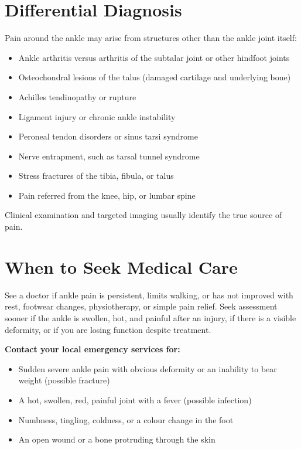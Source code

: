 \section*{Differential Diagnosis}
Pain around the ankle may arise from structures other than the ankle joint itself:

\begin{itemize}
    \item Ankle arthritis versus arthritis of the subtalar joint or other hindfoot joints
    \item Osteochondral lesions of the talus (damaged cartilage and underlying bone)
    \item Achilles tendinopathy or rupture
    \item Ligament injury or chronic ankle instability
    \item Peroneal tendon disorders or sinus tarsi syndrome
    \item Nerve entrapment, such as tarsal tunnel syndrome
    \item Stress fractures of the tibia, fibula, or talus
    \item Pain referred from the knee, hip, or lumbar spine
\end{itemize}

Clinical examination and targeted imaging usually identify the true source of pain.

\section*{When to Seek Medical Care}
See a doctor if ankle pain is persistent, limits walking, or has not improved with rest, footwear changes, physiotherapy, or simple pain relief. Seek assessment sooner if the ankle is swollen, hot, and painful after an injury, if there is a visible deformity, or if you are losing function despite treatment.

\textbf{Contact your local emergency services for:}
\begin{itemize}
    \item Sudden severe ankle pain with obvious deformity or an inability to bear weight (possible fracture)
    \item A hot, swollen, red, painful joint with a fever (possible infection)
    \item Numbness, tingling, coldness, or a colour change in the foot
    \item An open wound or a bone protruding through the skin
\end{itemize}


